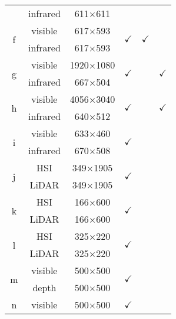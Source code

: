 \begin{table}[h!]
\begin{tabular}{ccccccc}
                      &                     & infrared &  611$\times$611  &  &  &  \\ \cline{1-7}
   \multicolumn{2}{c}{\multirow{2}{*}{f}}   &  visible &  617$\times$593  & \multirow{2}{*}{$\checkmark$} & \multirow{2}{*}{$\checkmark$} &  \\
                      &                     & infrared &  617$\times$593  &  &  &  \\ \cline{1-7}
   \multicolumn{2}{c}{\multirow{2}{*}{g}}   &  visible & 1920$\times$1080 & \multirow{2}{*}{$\checkmark$} &  & \multirow{2}{*}{$\checkmark$} \\
                      &                     & infrared &  667$\times$504  &  &  &  \\ \cline{1-7}
   \multicolumn{2}{c}{\multirow{2}{*}{h}}   &  visible & 4056$\times$3040 & \multirow{2}{*}{$\checkmark$} &  & \multirow{2}{*}{$\checkmark$} \\
                      &                     & infrared &  640$\times$512  &  &  &  \\ \cline{1-7}
   \multicolumn{2}{c}{\multirow{2}{*}{i}}   &  visible &  633$\times$460  & \multirow{2}{*}{$\checkmark$} &  &  \\
                      &                     & infrared &  670$\times$508  &  &  &  \\ \cline{1-7}
   \multicolumn{2}{c}{\multirow{2}{*}{j}}   &      HSI &  349$\times$1905 & \multirow{2}{*}{$\checkmark$} &  &  \\
                      &                     &    LiDAR &  349$\times$1905 &  &  &  \\ \cline{1-7}
   \multicolumn{2}{c}{\multirow{2}{*}{k}}   &      HSI &  166$\times$600  & \multirow{2}{*}{$\checkmark$} &  &  \\
                      &                     &    LiDAR &  166$\times$600  &  &  &  \\ \cline{1-7}
   \multicolumn{2}{c}{\multirow{2}{*}{l}}   &      HSI &  325$\times$220  & \multirow{2}{*}{$\checkmark$} &  &  \\
                      &                     &    LiDAR &  325$\times$220  &  &  &  \\ \cline{1-7}
   \multicolumn{2}{c}{\multirow{2}{*}{m}}   &  visible &  500$\times$500  & \multirow{2}{*}{$\checkmark$} &  &  \\
                      &                     &    depth &  500$\times$500  &  &  &  \\ \cline{1-7}
   \multicolumn{2}{c}{\multirow{2}{*}{n}}   &  visible &  500$\times$500  & \multirow{2}{*}{$\checkmark$} &  &  \\

\end{tabular}
\end{table}
